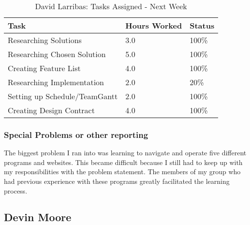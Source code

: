 \documentclass[12pt,article,compsoc]{IEEEtran}
\begin{document}
	\begin{table}[ht]
	\renewcommand{\arraystretch}{1.3}
		\caption{David Larribas: Tasks Assigned - Next Week}
		
		\label{Summary of David Larribas' activites: this week}
		
		\centering
		\begin{tabular}{p{5.5cm}|p{1cm}|p{1cm}}
		\hline

		\bfseries 	Task		 							& \bfseries Hours Worked	& \bfseries Status	\\
		\hline\hline
					Researching Solutions					& 3.0						& 100\%				\\	%
					Researching Chosen Solution				& 5.0						& 100\%				\\
					Creating Feature List					& 4.0						& 100\%				\\	%
					Researching Implementation				& 2.0						& 20\%				\\
					Setting up Schedule/TeamGantt			& 2.0						& 100\%				\\	%
					Creating Design Contract				& 4.0						& 100\%				\\
		\hline
		\end{tabular}
	\end{table}

	\subsubsection*{Special Problems or other reporting}
	The biggest problem I ran into was learning to navigate and operate five different programs and
	websites.  This became difficult because I still had to keep up with my responsibilities with the 
	problem statement.  The members of my group who had previous experience with these programs greatly 
	facilitated the learning process.  
	
	\clearpage
\subsection{Devin Moore}
\end{document}
